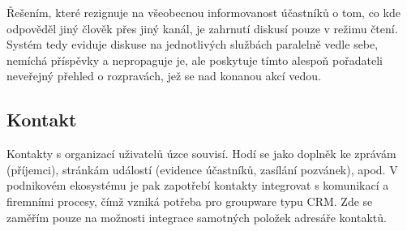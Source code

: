 \documentclass[12pt,oneside,final]{fithesis2}
\begin{document}
Řešením, které rezignuje na všeobecnou informovanost účastníků o tom, co kde odpověděl jiný člověk přes jiný kanál, je zahrnutí diskusí pouze v režimu čtení. Systém tedy eviduje diskuse na jednotlivých službách paralelně vedle sebe, nemíchá příspěvky a nepropaguje je, ale poskytuje tímto alespoň pořadateli neveřejný přehled o rozpravách, jež se nad konanou akcí vedou.

\subsection{Kontakt}
Kontakty s organizací uživatelů úzce souvisí. Hodí se jako doplněk ke zprávám (příjemci), stránkám událostí (evidence účastníků, zasílání pozvánek), apod. V podnikovém ekosystému je pak zapotřebí kontakty integrovat s komunikací a firemními procesy, čímž vzniká potřeba pro groupware typu CRM. Zde se zaměřím pouze na možnosti integrace samotných položek adresáře kontaktů.
\end{document}
